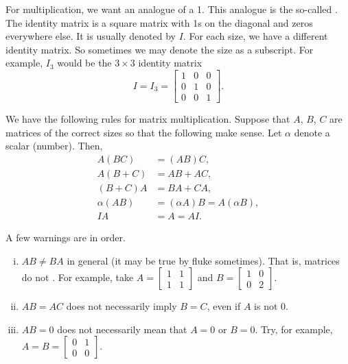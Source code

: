 For multiplication, we want an analogue of a 1.  This analogue is the
so-called \emph{}.
The identity matrix is a square matrix with 1s on the
diagonal and zeros everywhere else.  It is usually denoted by $I$.
For each size, we have a different identity matrix.
So sometimes we may denote
the size as a subscript.  For example, $I_3$ would be the $3 \times 3$
identity matrix
\begin{equation*}
I = I_3 =
\begin{bmatrix}
1 & 0 & 0 \\
0 & 1 & 0 \\
0 & 0 & 1
\end{bmatrix} .
\end{equation*}

\pagebreak[2]
We have the following rules for matrix multiplication.  Suppose that
$A$, $B$, $C$ are matrices of the correct sizes so that the following
make sense.  Let $\alpha$ denote a scalar (number).
Then,
\begin{align*}
A(BC) & = (AB)C, \\
A(B+C) & = AB + AC, \\
(B+C)A & = BA + CA, \\
\alpha(AB) & = (\alpha A)B = A(\alpha B), \\
IA & = A = AI .
\end{align*}

\pagebreak[2]
A few warnings are in order.
\begin{enumerate}[(i)]
\item $AB \neq BA$ in general (it may be true by fluke sometimes).  That is,
matrices do not .
For example, take
$A = \left[ \begin{smallmatrix} 1 & 1 \\ 1 & 1 \end{smallmatrix} \right]$
and
$B = \left[ \begin{smallmatrix} 1 & 0 \\ 0 & 2 \end{smallmatrix} \right]$.
\item $AB = AC$ does not necessarily imply $B=C$, even if $A$ is not 0.
\item $AB = 0$ does not necessarily mean that $A=0$ or $B=0$.
Try, for example,
$A = B = \left[ \begin{smallmatrix} 0 & 1 \\ 0 & 0 \end{smallmatrix}
\right]$.
\end{enumerate}

